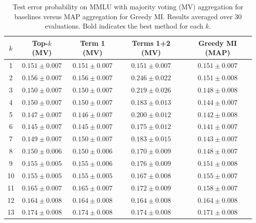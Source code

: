 \documentclass{article}
\theoremstyle{plain}
\theoremstyle{definition}
\theoremstyle{remark}
\begin{document}
\begin{table}[ht]
\centering
\caption{Test error probability on MMLU with majority voting (MV) aggregation for baselines versus MAP aggregation for Greedy MI. Results averaged over 30 evaluations. Bold indicates the best method for each $k$.}
\label{tab:mmlu_mv_vs_map}
\small
\begin{tabular}{ccccc}
\toprule
$k$ & Top-$k$ (MV) & Term 1 (MV) & Terms 1+2 (MV) & Greedy MI (MAP) \\
\midrule
1  & $0.151 \pm 0.007$ & $0.151 \pm 0.007$ & $0.151 \pm 0.007$ & $0.151 \pm 0.007$ \\
2  & $0.156 \pm 0.007$ & $0.156 \pm 0.007$ & $0.246 \pm 0.022$ & $\mathbf{0.151 \pm 0.008}$ \\
3  & $0.150 \pm 0.007$ & $0.150 \pm 0.007$ & $0.219 \pm 0.026$ & $\mathbf{0.148 \pm 0.008}$ \\
4  & $0.150 \pm 0.007$ & $0.150 \pm 0.007$ & $0.183 \pm 0.013$ & $\mathbf{0.144 \pm 0.007}$ \\
5  & $0.147 \pm 0.007$ & $0.146 \pm 0.007$ & $0.200 \pm 0.012$ & $\mathbf{0.142 \pm 0.008}$ \\
6  & $0.145 \pm 0.007$ & $0.145 \pm 0.007$ & $0.175 \pm 0.012$ & $\mathbf{0.141 \pm 0.007}$ \\
7  & $0.149 \pm 0.007$ & $0.150 \pm 0.007$ & $0.183 \pm 0.015$ & $\mathbf{0.143 \pm 0.007}$ \\
8  & $0.150 \pm 0.006$ & $0.150 \pm 0.006$ & $0.170 \pm 0.009$ & $\mathbf{0.148 \pm 0.007}$ \\
9  & $0.155 \pm 0.005$ & $0.155 \pm 0.006$ & $0.176 \pm 0.009$ & $\mathbf{0.151 \pm 0.008}$ \\
10 & $0.155 \pm 0.005$ & $0.155 \pm 0.005$ & $0.167 \pm 0.008$ & $0.155 \pm 0.007$ \\
11 & $0.165 \pm 0.007$ & $0.165 \pm 0.007$ & $0.172 \pm 0.009$ & $\mathbf{0.158 \pm 0.007}$ \\
12 & $0.164 \pm 0.008$ & $0.164 \pm 0.008$ & $0.164 \pm 0.008$ & $0.164 \pm 0.008$ \\
13 & $0.174 \pm 0.008$ & $0.174 \pm 0.008$ & $0.174 \pm 0.008$ & $\mathbf{0.171 \pm 0.008}$ \\
\bottomrule
\end{tabular}
\end{table}
\end{document}
